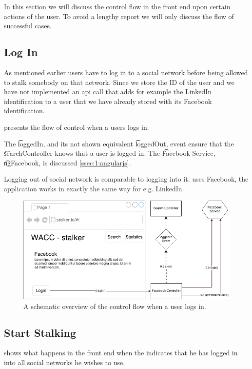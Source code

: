 In this section we will discuss the control flow in the front end upon certain actions of the user. To avoid a lengthy report we will only discuss the flow of successful cases.

\subsection{Log In}
\label{ss:1:login}
	As mentioned earlier users have to log in to a social network before being allowed to stalk somebody on that network. Since we store the ID of the user and we have not implemented an api call that adds for example the LinkedIn identification to a user that we have already stored with its Facebook identification.

	 presents the flow of control when a users logs in.

	The \t{loggedIn}, and its not shown equivalent \t{loggedOut}, event ensure that the \t{searchController} knows that a user is logged in. The \t{Facebook Service}, \t{ngFacebook}, is discussed \vref{ssec:1:angularjs}. 

	Logging out of social network is comparable to logging into it.  uses Facebook, the application works in exactly the same way for e.g. LinkedIn.

	\begin{figure}
		\includegraphics[width=\textwidth]{./img/1_login_flow}
		\caption{A schematic overview of the control flow when a user logs in.}
		\label{fig:1:controlflowLogIn}
	\end{figure}	

\subsection{Start Stalking}
\label{ss:1:startStalking}
	 shows what happens in the front end when the indicates that he has logged in into all social networks he wishes to use. 

